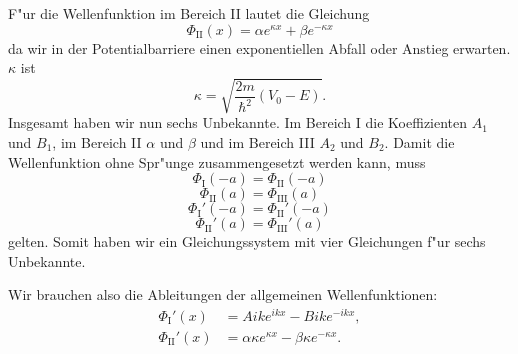 \begin{refsection}
F"ur die Wellenfunktion im Bereich \textrm{II} lautet die Gleichung
\[
\Phi_\text{II}(x) = \alpha e^{\kappa x} + \beta e^{-\kappa x}
\]
da wir in der Potentialbarriere einen exponentiellen Abfall oder Anstieg erwarten. 
$\kappa$ ist
\[
\kappa = \sqrt{\frac{2m}{\hbar^2}(V_0 - E)}.
\]
Insgesamt haben wir nun sechs Unbekannte. 
Im Bereich \textrm{I} die Koeffizienten $A_1$ und $B_1$, im Bereich \textrm{II} $\alpha$ und $\beta$ und im Bereich \textrm{III} $A_2$ und $B_2$. 
Damit die Wellenfunktion ohne Spr"unge zusammengesetzt werden kann, muss
\begin{equation}
\Phi_\text{I}(-a) = \Phi_\text{II}(-a)
\label{tunnel:fktwert-a}
\end{equation}
\begin{equation}
\Phi_\text{II}(a) = \Phi_\text{III}(a)
\label{tunnel:fktwerta}
\end{equation}
\begin{equation}
\Phi_\text{I}'(-a) = \Phi_\text{II}'(-a)
\label{tunnel:steigung-a}
\end{equation}
\begin{equation}
\Phi_\text{II}'(a) = \Phi_\text{III}'(a)
\label{tunnel:steigunga}
\end{equation}
gelten.
Somit haben wir ein Gleichungssystem mit vier Gleichungen f"ur sechs Unbekannte.

Wir brauchen also die Ableitungen der allgemeinen Wellenfunktionen:
\begin{align*}
\Phi_\text{I}'(x) &= Aike^{ikx} - Bike^{-ikx},
\\
\Phi_\text{II}'(x) &= \alpha \kappa e^{\kappa x} - \beta \kappa e^{-\kappa x}.
\end{align*}


\end{refsection}
